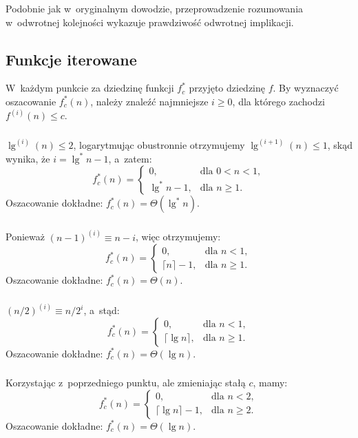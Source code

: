 Podobnie jak w~oryginalnym dowodzie, przeprowadzenie rozumowania w~odwrotnej kolejności wykazuje prawdziwość odwrotnej implikacji.

\subsection{Funkcje iterowane} %

W~każdym punkcie za dziedzinę funkcji $f_c^*$ przyjęto dziedzinę $f$. By wyznaczyć oszacowanie $f_c^*(n)$, należy znaleźć najmniejsze $i\ge0$, dla którego zachodzi $f^{(i)}(n)\le c$.

\subsubsection{} %
$\lg^{(i)}(n)\le2$, logarytmując obustronnie otrzymujemy $\lg^{(i+1)}(n)\le 1$, skąd wynika, że $i=\lg^*n-1$, a~zatem:
\[
	f_c^*(n) =
	\begin{cases}
		0, & \text{dla $0<n<1$}, \\
		\lg^*n-1, & \text{dla $n\ge1$}.
	\end{cases}
\]
Oszacowanie dokładne: $f_c^*(n)=\Theta(\lg^*n)$.

\subsubsection{} %
Ponieważ $(n-1)^{(i)}\equiv n-i$, więc otrzymujemy:
\[
	f_c^*(n) =
	\begin{cases}
		0, & \text{dla $n<1$}, \\
		\lceil n\rceil-1, & \text{dla $n\ge1$}.
	\end{cases}
\]
Oszacowanie dokładne: $f_c^*(n)=\Theta(n)$.

\subsubsection{} %
$(n/2)^{(i)}\equiv n/2^i$, a~stąd:
\[
	f_c^*(n) =
	\begin{cases}
		0, & \text{dla $n<1$}, \\
		\lceil\lg n\rceil, & \text{dla $n\ge1$}.
	\end{cases}
\]
Oszacowanie dokładne: $f_c^*(n)=\Theta(\lg n)$.

\subsubsection{} %
Korzystając z~poprzedniego punktu, ale zmieniając stałą $c$, mamy:
\[
	f_c^*(n) =
	\begin{cases}
		0, & \text{dla $n<2$}, \\
		\lceil\lg n\rceil-1, & \text{dla $n\ge2$}.
	\end{cases}
\]
Oszacowanie dokładne: $f_c^*(n)=\Theta(\lg n)$.


